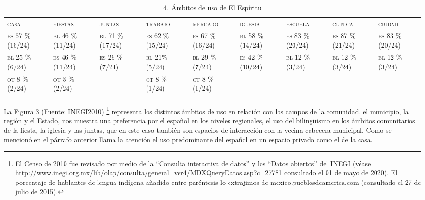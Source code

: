 \documentclass[output=paper]{../langscibook}
\begin{document}
\begin{table}
\caption{\label{tab:guerrero}4. Ámbitos de uso de El Espíritu}
\begin{tabularx}{\textwidth}{XXXXXXXXX}
\lsptoprule
{\textsc{casa}} & {\textsc{fiestas}} & {\textsc{juntas}} & {\textsc{trabajo}} & {\textsc{mercado}} & {\textsc{iglesia}} & {\textsc{escuela}} & {\textsc{clínica}} & {\textsc{ciudad}}\\
{\textsc{es} \textsc{67} \textsc{\%} \textsc{(16/24)}} & {\textsc{bl} \textsc{46} \textsc{\%} \textsc{(11/24)}} & {\textsc{bl} \textsc{71} \textsc{\%} \textsc{(17/24)}} & {\textsc{es} \textsc{62} \textsc{\%} \textsc{(15/24)}} & {\textsc{es} \textsc{67} \textsc{\%} \textsc{(16/24)}} & {\textsc{bl} \textsc{58} \textsc{\%} \textsc{(14/24)}} & {\textsc{es} \textsc{83} \textsc{\%} \textsc{(20/24)}} & {\textsc{es} \textsc{87} \textsc{\%} \textsc{(21/24)}} & {\textsc{es} \textsc{83} \textsc{\%} \textsc{(20/24)}}\\
{\textsc{bl} \textsc{25} \textsc{\%} \textsc{(6/24)}} & {\textsc{es} \textsc{46} \textsc{\%}  \textsc{(11/24)}} & {\textsc{es} \textsc{29} \textsc{\%} \textsc{(7/24)}} & {\textsc{bl} \textsc{21\%} \textsc{(5/24)}} & {\textsc{bl} \textsc{29} \textsc{\%} \textsc{(7/24)}} & {\textsc{es} \textsc{42} \textsc{\%} \textsc{(10/24)}} & {\textsc{bl} \textsc{12} \textsc{\%}  \textsc{(3/24)}} & {\textsc{bl} \textsc{12} \textsc{\%}  \textsc{(3/24)}} & {\textsc{bl} \textsc{12} \textsc{\%}  \textsc{(3/24)}}\\
{\textsc{ot} \textsc{8} \textsc{\%} \textsc{(2/24)}} & {\textsc{ot} \textsc{8} \textsc{\%} \textsc{(2/24)}} &  & {\textsc{ot} \textsc{8} \textsc{\%} \textsc{(1/24)}} & {\textsc{ot} \textsc{8} \textsc{\%} \textsc{(1/24)}} &  &  &  & \\
\lspbottomrule
\end{tabularx}
\end{table}

La Figura 3 (Fuente: INEGI2010) \footnote{El Censo de 2010 fue revisado por medio de la “Consulta interactiva de datos” y los “Datos abiertos” del INEGI (véase http://www.inegi.org.mx/lib/olap/consulta/general\_ver4/MDXQueryDatos.asp?c=27781 consultado el 01 de mayo de 2020). El porcentaje de hablantes de lengua indígena añadido entre paréntesis lo extrajimos de mexico.pueblosdeamerica.com (consultado el 27 de julio de 2015).} representa los distintos ámbitos de uso en relación con los campos de la comunidad, el municipio, la región y el Estado, nos muestra una preferencia por el español en los niveles regionales, el uso del bilingüismo en los ámbitos comunitarios de la fiesta, la iglesia y las juntas, que en este caso también son espacios de interacción con la vecina cabecera municipal. Como se mencionó en el párrafo anterior llama la atención el uso predominante del español en un espacio privado como el de la casa.
\end{document}
